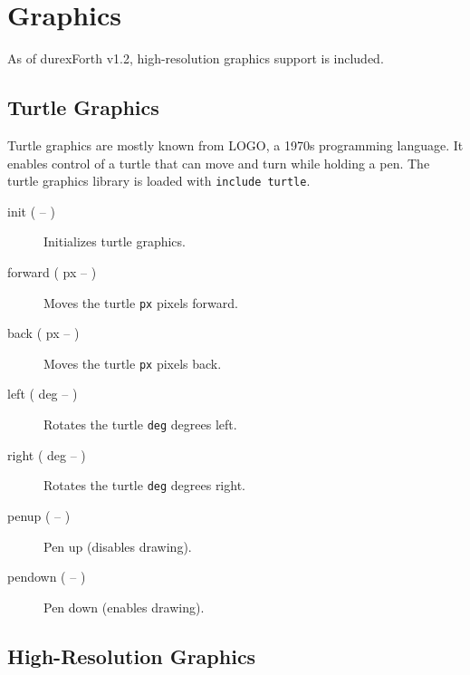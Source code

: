 \chapter{Graphics}

As of durexForth v1.2, high-resolution graphics support is included.

\section{Turtle Graphics}

Turtle graphics are mostly known from LOGO, a 1970s programming language.
It enables control of a turtle that can move and turn while holding a pen.
The turtle graphics library is loaded with \texttt{include turtle}.

\begin{description}
\item[init ( -- )] Initializes turtle graphics.
\item[forward ( px -- )] Moves the turtle \texttt{px} pixels forward.
\item[back ( px -- )] Moves the turtle \texttt{px} pixels back.
\item[left ( deg -- )] Rotates the turtle \texttt{deg} degrees left.
\item[right ( deg -- )] Rotates the turtle \texttt{deg} degrees right.
\item[penup ( -- )] Pen up (disables drawing).
\item[pendown ( -- )] Pen down (enables drawing).
\end{description}

\section{High-Resolution Graphics}

